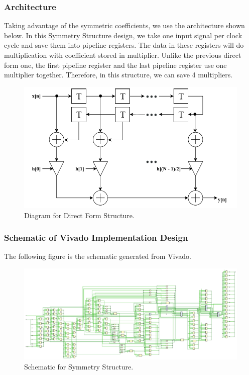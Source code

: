 \documentclass[a4paper]{article}
\begin{document}
\subsubsection{Architecture}
Taking advantage of the symmetric coefficients, we use the architecture shown below. In this Symmetry Structure design, we take one input signal per clock cycle and save them into pipeline registers. The data in these registers will do multiplication with coefficient stored in multiplier. Unlike the previous direct form one, the first pipeline register and the last pipeline register use one multiplier together. Therefore, in this structure, we can save 4 multipliers.
\begin{figure}[H]
    \centering
    \includegraphics[width=1\textwidth]{siyuan/Sym structure.png}
    \caption{Diagram for Direct Form Structure.}
\end{figure}

\subsubsection{Schematic of Vivado Implementation Design}
The following figure is the schematic generated from Vivado.
\begin{figure}[H]
    \centering
    \includegraphics[width=1\textwidth]{siyuan/Sym schematic.png}
    \caption{Schematic for Symmetry Structure.}
\end{figure}
\end{document}
